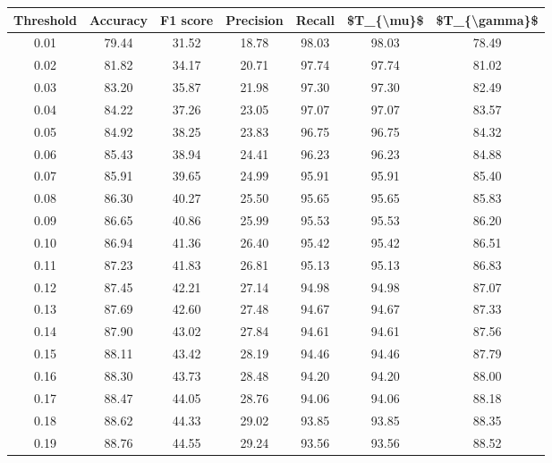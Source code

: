 \begin{tabular}{|c|c|c|c|c|c|c|}
\hline
 Threshold &  Accuracy &  F1 score &  Precision &  Recall &  \$T\_\{\textbackslash mu\}\$ &  \$T\_\{\textbackslash gamma\}\$ \\
\hline
      0.01 &     79.44 &     31.52 &      18.78 &   98.03 &      98.03 &         78.49 \\
      0.02 &     81.82 &     34.17 &      20.71 &   97.74 &      97.74 &         81.02 \\
      0.03 &     83.20 &     35.87 &      21.98 &   97.30 &      97.30 &         82.49 \\
      0.04 &     84.22 &     37.26 &      23.05 &   97.07 &      97.07 &         83.57 \\
      0.05 &     84.92 &     38.25 &      23.83 &   96.75 &      96.75 &         84.32 \\
      0.06 &     85.43 &     38.94 &      24.41 &   96.23 &      96.23 &         84.88 \\
      0.07 &     85.91 &     39.65 &      24.99 &   95.91 &      95.91 &         85.40 \\
      0.08 &     86.30 &     40.27 &      25.50 &   95.65 &      95.65 &         85.83 \\
      0.09 &     86.65 &     40.86 &      25.99 &   95.53 &      95.53 &         86.20 \\
      0.10 &     86.94 &     41.36 &      26.40 &   95.42 &      95.42 &         86.51 \\
      0.11 &     87.23 &     41.83 &      26.81 &   95.13 &      95.13 &         86.83 \\
      0.12 &     87.45 &     42.21 &      27.14 &   94.98 &      94.98 &         87.07 \\
      0.13 &     87.69 &     42.60 &      27.48 &   94.67 &      94.67 &         87.33 \\
      0.14 &     87.90 &     43.02 &      27.84 &   94.61 &      94.61 &         87.56 \\
      0.15 &     88.11 &     43.42 &      28.19 &   94.46 &      94.46 &         87.79 \\
      0.16 &     88.30 &     43.73 &      28.48 &   94.20 &      94.20 &         88.00 \\
      0.17 &     88.47 &     44.05 &      28.76 &   94.06 &      94.06 &         88.18 \\
      0.18 &     88.62 &     44.33 &      29.02 &   93.85 &      93.85 &         88.35 \\
      0.19 &     88.76 &     44.55 &      29.24 &   93.56 &      93.56 &         88.52 \\

\end{tabular}
